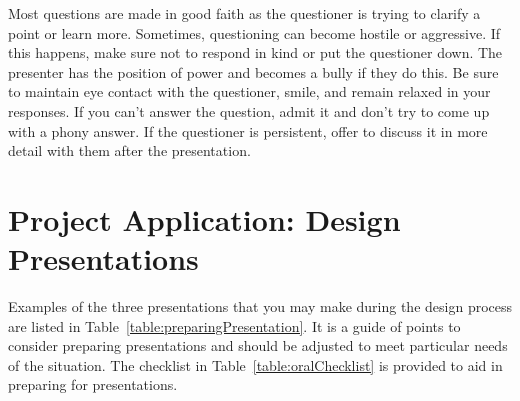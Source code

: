 Most questions are made in good faith as the questioner is trying to
clarify a point or learn more. Sometimes, questioning can become hostile
or aggressive. If this happens, make sure not to respond in kind or put
the questioner down. The presenter has the position of power and becomes
a bully if they do this. Be sure to maintain eye contact with the
questioner, smile, and remain relaxed in your responses. If you can't
answer the question, admit it and don't try to come up with a phony
answer. If the questioner is persistent, offer to discuss it in more
detail with them after the presentation.

\section{Project Application: Design Presentations}
\label{section:project-application-design-presentations}

Examples of the three presentations that you may make during the design
process are listed in Table~\ref{table:preparingPresentation}. 
It is a guide of points to consider
preparing presentations and should be adjusted to meet particular needs
of the situation. The checklist in Table~\ref{table:oralChecklist} 
is provided to aid in preparing for presentations.


